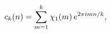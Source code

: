 \[\mathop{c_{k}\/}\nolimits\!\left(n\right)=\sum_{m=1}^{k}\mathop{\chi_{1}\/}%
\nolimits\!\left(m\right)e^{2\pi imn/k},\]